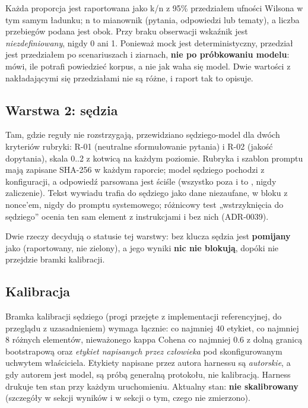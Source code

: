 Każda proporcja jest raportowana jako k/n z 95\% przedziałem ufności Wilsona w tym samym ładunku; n to mianownik (pytania, odpowiedzi lub tematy), a liczba przebiegów podana jest obok. Przy braku obserwacji wskaźnik jest \emph{niezdefiniowany}, nigdy 0 ani 1. Ponieważ mock jest deterministyczny, przedział jest przedziałem po scenariuszach i ziarnach, \textbf{nie po próbkowaniu modelu}: mówi, ile potrafi powiedzieć korpus, a nie jak waha się model. Dwie wartości z nakładającymi się przedziałami nie są różne, i raport tak to opisuje.

\subsection{Warstwa 2: sędzia}

Tam, gdzie reguły nie rozstrzygają, przewidziano sędziego-model dla dwóch kryteriów rubryki: R-01 (neutralne sformułowanie pytania) i R-02 (jakość dopytania), skala 0..2 z kotwicą na każdym poziomie. Rubryka i szablon promptu mają zapisane SHA-256 w każdym raporcie; model sędziego pochodzi z konfiguracji, a odpowiedź parsowana jest ściśle (wszystko poza  i  to , nigdy zaliczenie). Tekst wywiadu trafia do sędziego jako dane niezaufane, w bloku z nonce'em, nigdy do promptu systemowego; różnicowy test „wstrzyknięcia do sędziego” ocenia ten sam element z instrukcjami i bez nich (ADR-0039).

Dwie rzeczy decydują o statusie tej warstwy: bez klucza sędzia jest \textbf{pomijany} jako  (raportowany, nie zielony), a jego wyniki \textbf{nic nie blokują}, dopóki nie przejdzie bramki kalibracji.

\subsection{Kalibracja}

Bramka kalibracji sędziego (progi przejęte z implementacji referencyjnej, do przeglądu z uzasadnieniem) wymaga łącznie: co najmniej 40 etykiet, co najmniej 8 różnych elementów, nieważonego kappa Cohena co najmniej 0.6 z dolną granicą bootstrapową oraz \emph{etykiet napisanych przez człowieka} pod skonfigurowanym uchwytem właściciela. Etykiety napisane przez autora harnessu są \emph{autorskie}, a gdy autorem jest model, są próbą generalną protokołu, nie kalibracją. Harness drukuje ten stan przy każdym uruchomieniu. Aktualny stan: \textbf{nie skalibrowany} (szczegóły w sekcji wyników i w sekcji o tym, czego nie zmierzono).

